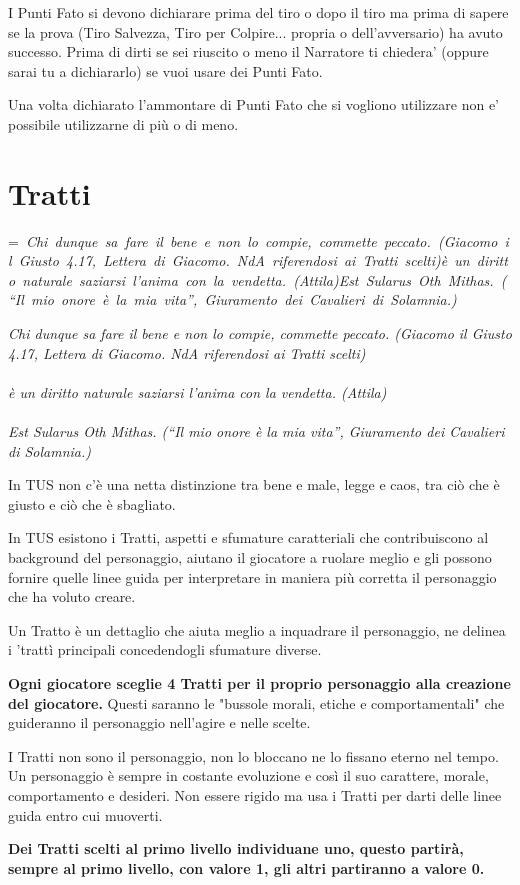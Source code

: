\documentclass[a4paper,11pt,twoside,openany]{book}
\makeatletter
\newcommand{\mybox}[1]{%
	\setbox0=\hbox{#1}%
	\setlength{\@tempdima}{\dimexpr\wd0+13pt}%
	\begin{tcolorbox}[boxrule=0.5pt,arc=4pt, breakable,enhanced,
		left=6pt,right=6pt,top=6pt,bottom=6pt,boxsep=0pt,width=\@tempdima]
		#1
	\end{tcolorbox}
}
\makeatother
\begin{document}
I Punti Fato si devono dichiarare prima del tiro o dopo il tiro ma prima di sapere se la prova (Tiro Salvezza, Tiro per Colpire... propria o dell’avversario) ha avuto successo. 
Prima di dirti se sei riuscito o meno il Narratore ti chiedera’ (oppure sarai tu a dichiararlo) se vuoi usare dei Punti Fato.

Una volta dichiarato l’ammontare di Punti Fato che si vogliono utilizzare non e’ possibile utilizzarne di più o di meno.

\section{Tratti}

\label{tratti}
\mybox{\textit{
Chi dunque sa fare il bene e non lo compie, commette peccato. (Giacomo il Giusto 4.17, Lettera di Giacomo. NdA riferendosi ai Tratti scelti)\\\\
è un diritto naturale saziarsi l'anima con la vendetta. (Attila)\\\\
Est Sularus Oth Mithas. (“Il mio onore è la mia vita”, Giuramento dei Cavalieri di Solamnia.)}}\medskip

In TUS non c'è una netta distinzione tra bene e male, legge e caos, tra ciò che è giusto e ciò che è sbagliato.

In TUS esistono i Tratti, aspetti e sfumature caratteriali che contribuiscono al background del personaggio, aiutano il giocatore a ruolare meglio e gli possono fornire quelle linee guida per interpretare in maniera più corretta il personaggio che ha voluto creare.

Un Tratto è un dettaglio che aiuta meglio a inquadrare il personaggio, ne delinea i 'trattì principali concedendogli sfumature diverse.

\textbf{Ogni giocatore sceglie 4 Tratti per il proprio personaggio alla creazione del giocatore.} Questi saranno le "bussole morali, etiche e comportamentali" che guideranno il personaggio nell'agire e nelle scelte.

I Tratti non sono il personaggio, non lo bloccano ne lo fissano eterno nel tempo. Un personaggio è sempre in costante evoluzione e così il suo carattere, morale, comportamento e desideri. Non essere rigido ma usa i Tratti per darti delle linee guida entro cui muoverti.

\textbf{Dei Tratti scelti al primo livello individuane uno, questo partirà, sempre al primo livello, con valore 1, gli altri partiranno a valore 0.}
\end{document}
